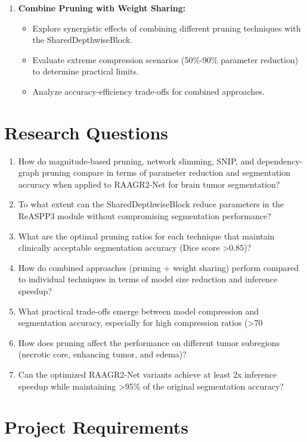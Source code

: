 \documentclass[conference]{IEEEtran}
\begin{document}
\begin{enumerate}[label=\textbf{\arabic*.}]
    \item \textbf{Combine Pruning with Weight Sharing:}
    \begin{itemize}[label=--]
        \item Explore synergistic effects of combining different pruning techniques with the SharedDepthwiseBlock.
        \item Evaluate extreme compression scenarios (50\%-90\% parameter reduction) to determine practical limits.
        \item Analyze accuracy-efficiency trade-offs for combined approaches.
    \end{itemize}
\end{enumerate}

\section{Research Questions}
\begin{enumerate}[label=\textbf{\arabic*.}]
    \item How do magnitude-based pruning, network slimming, SNIP, and dependency-graph pruning compare in terms of parameter reduction and segmentation accuracy when applied to RAAGR2-Net for brain tumor segmentation?
    \item To what extent can the SharedDepthwiseBlock reduce parameters in the ReASPP3 module without compromising segmentation performance?
    \item What are the optimal pruning ratios for each technique that maintain clinically acceptable segmentation accuracy (Dice score >0.85)?
    \item How do combined approaches (pruning + weight sharing) perform compared to individual techniques in terms of model size reduction and inference speedup?
    \item What practical trade-offs emerge between model compression and segmentation accuracy, especially for high compression ratios (>70%
    \item How does pruning affect the performance on different tumor subregions (necrotic core, enhancing tumor, and edema)?
    \item Can the optimized RAAGR2-Net variants achieve at least 2x inference speedup while maintaining >95\% of the original segmentation accuracy?
\end{enumerate}

\section{Project Requirements}
\end{document}
